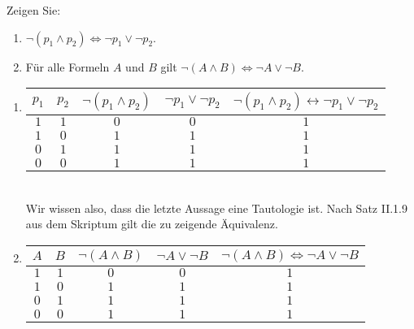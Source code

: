 
\begin{exercise}[18]

Zeigen Sie:

\begin{enumerate}[label = \alph*]
    \item $\neg (p_1 \land p_2) \Leftrightarrow \neg p_1 \lor \neg p_2$.
    \item Für alle Formeln $A$ und $B$ gilt $\neg (A \land B) \Leftrightarrow \neg A \lor \neg B$.
\end{enumerate}

\end{exercise}


\begin{solution}

\phantom{}

\begin{enumerate}[label = \alph*]

    \item \phantom{}

    \begin{tabular}{|c|c|c|c|c|}
        \hline
        $p_1$ & $p_2$ & $\neg (p_1 \land p_2)$ & $\neg p_1 \lor \neg p_2$ & $\neg (p_1 \land p_2) \leftrightarrow \neg p_1 \lor \neg p_2$ \\
        \hline
        $1$ & $1$ & $0$ & $0$ & $1$\\
        \hline
        $1$ & $0$ & $1$ & $1$ & $1$\\
        \hline
        $0$ & $1$ & $1$ & $1$ & $1$\\
        \hline
        $0$ & $0$ & $1$ & $1$ & $1$\\
        \hline
    \end{tabular} \\

    Wir wissen also, dass die letzte Aussage eine Tautologie ist.
    Nach Satz II.1.9 aus dem Skriptum gilt die zu zeigende Äquivalenz.

    \item \phantom{}
    
    \begin{tabular}{|c|c|c|c|c|}
        \hline
        $A$ & $B$ & $\neg (A \land B)$ & $\neg A \lor \neg B$ & $\neg (A \land B) \Leftrightarrow \neg A \lor \neg B$ \\
        \hline
        $1$ & $1$ & $0$ & $0$ & $1$\\
        \hline
        $1$ & $0$ & $1$ & $1$ & $1$\\
        \hline
        $0$ & $1$ & $1$ & $1$ & $1$\\
        \hline
        $0$ & $0$ & $1$ & $1$ & $1$\\
        \hline
    \end{tabular}        

\end{enumerate}

\end{solution}

